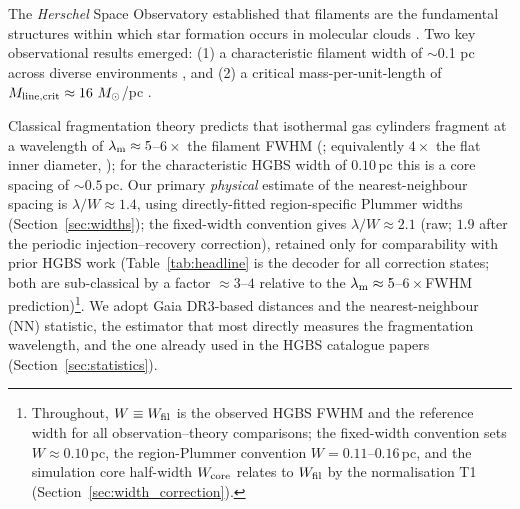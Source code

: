 \documentclass[usenatbib,twoside,twocolumn]{mnras}
\begin{document}
The \textit{Herschel} Space Observatory established that filaments are the fundamental structures within which star formation occurs in molecular clouds \citep{Andre2010}. Two key observational results emerged: (1) a characteristic filament width of $\sim$0.1 pc across diverse environments \citep{Arzoumanian2011}, and (2) a critical mass-per-unit-length of $M_{\rm line,crit} \approx 16~M_\odot$/pc \citep{Ostriker1964}.

Classical fragmentation theory \citep{Inutsuka1992} predicts that isothermal gas cylinders fragment at a wavelength of $\lambda_{\rm m}\approx5$--$6\times$ the filament FWHM (\citealt{Fischera2012}; equivalently $4\times$ the flat inner diameter, \citealt{Inutsuka1992}); for the characteristic HGBS width of $0.10$\,pc this is a core spacing of $\sim0.5$\,pc. Our primary \emph{physical} estimate of the nearest-neighbour spacing is $\lambda/W\approx1.4$, using directly-fitted region-specific Plummer widths (Section~\ref{sec:widths}); the fixed-width convention gives $\lambda/W\approx2.1$ (raw; $1.9$ after the periodic injection--recovery correction), retained only for comparability with prior HGBS work (Table~\ref{tab:headline} is the decoder for all correction states; both are sub-classical by a factor $\approx3$--$4$ relative to the $\lambda_{\rm m}\approx5$--$6\times$FWHM prediction)\footnote{Throughout, $W\equiv W_{\rm fil}$ is the observed HGBS FWHM and the reference width for all observation--theory comparisons; the fixed-width convention sets $W\approx0.10$\,pc, the region-Plummer convention $W=0.11$--$0.16$\,pc, and the simulation core half-width $W_{\rm core}$ relates to $W_{\rm fil}$ by the normalisation T1 (Section~\ref{sec:width_correction}).}. We adopt Gaia DR3-based distances \citep{Zhang2023} and the nearest-neighbour (NN) statistic, the estimator that most directly measures the fragmentation wavelength, and the one already used in the HGBS catalogue papers \citep{Konyves2015,Konyves2020} (Section~\ref{sec:statistics}).
\end{document}
